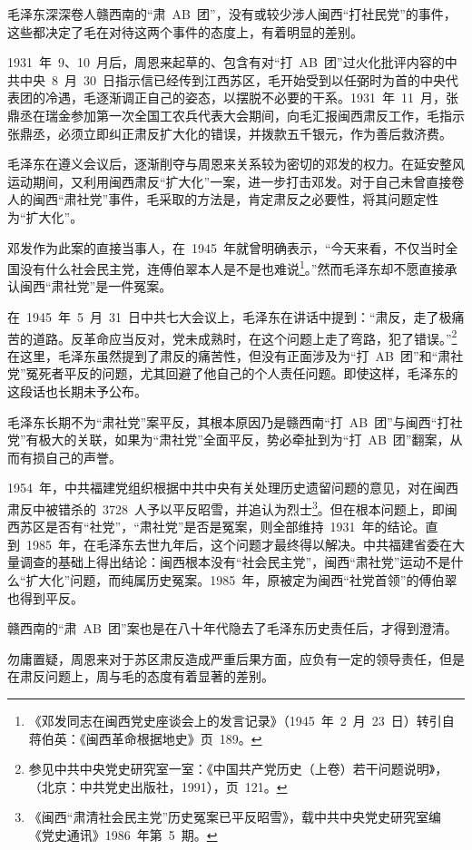 毛泽东深深卷人赣西南的“肃~AB~团”，没有或较少涉人闽西“打社民党”的事件，这些都决定了毛在对待这两个事件的态度上，有着明显的差别。

1931~年~9、10~月后，周恩来起草的、包含有对“打~AB~团”过火化批评内容的中共中央~8~月~30~日指示信已经传到江西苏区，毛开始受到以任弼时为首的中央代表团的冷遇，毛逐渐调正自己的姿态，以摆脱不必要的干系。1931~年~11~月，张鼎丞在瑞金参加第一次全国工农兵代表大会期间，向毛汇报闽西肃反工作，毛指示张鼎丞，必须立即纠正肃反扩大化的错误，并拨款五千银元，作为善后救济费。

毛泽东在遵义会议后，逐渐削夺与周恩来关系较为密切的邓发的权力。在延安整风运动期间，又利用闽西肃反“扩大化”一案，进一步打击邓发。对于自己未曾直接卷人的闽西“肃社党”事件，毛采取的方法是，肯定肃反之必要性，将其问题定性为“扩大化”。

邓发作为此案的直接当事人，在~1945~年就曾明确表示，“今天来看，不仅当时全国没有什么社会民主党，连傅伯翠本人是不是也难说\footnote{《邓发同志在闽西党史座谈会上的发言记录》（1945~年~2~月~23~日）转引自蒋伯英：《闽西革命根据地史》页~189。}。”然而毛泽东却不愿直接承认闽西“肃社党”是一件冤案。

在~1945~年~5~月~31~日中共七大会议上，毛泽东在讲话中提到：“肃反，走了极痛苦的道路。反革命应当反对，党未成熟时，在这个问题上走了弯路，犯了错误。”\footnote{参见中共中央党史研究室一室：《中国共产党历史（上卷）若干问题说明》，（北京：中共党史出版社，1991），页~121。}在这里，毛泽东虽然提到了肃反的痛苦性，但没有正面涉及为“打~AB~团”和“肃社党”冤死者平反的问题，尤其回避了他自己的个人责任问题。即使这样，毛泽东的这段话也长期未予公布。

毛泽东长期不为“肃社党”案平反，其根本原因乃是赣西南“打~AB~团”与闽西“打社党”有极大的关联，如果为“肃社党”全面平反，势必牵扯到为“打~AB~团”翻案，从而有损自己的声誉。

1954~年，中共福建党组织根据中共中央有关处理历史遗留问题的意见，对在闽西肃反中被错杀的~3728~人予以平反昭雪，并追认为烈士\footnote{《闽西“肃清社会民主党”历史冤案已平反昭雪》，载中共中央党史研究室编《党史通讯》1986~年第~5~期。}。但在根本问题上，即闽西苏区是否有“社党”，“肃社党”是否是冤案，则全部维持~1931~年的结论。直到~1985~年，在毛泽东去世九年后，这个问题才最终得以解决。中共福建省委在大量调查的基础上得出结论：闽西根本没有“社会民主党”，闽西“肃社党”运动不是什么“扩大化”问题，而纯属历史冤案。1985~年，原被定为闽西“社党首领”的傅伯翠也得到平反。

赣西南的“肃~AB~团”案也是在八十年代隐去了毛泽东历史责任后，才得到澄清。

勿庸置疑，周恩来对于苏区肃反造成严重后果方面，应负有一定的领导责任，但是在肃反问题上，周与毛的态度有着显著的差别。

